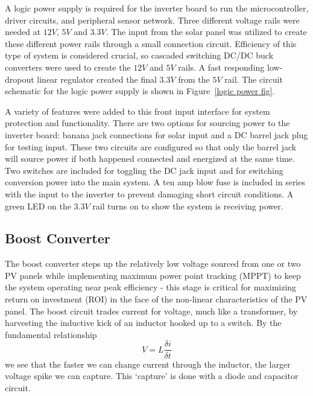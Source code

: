 A logic power supply is required for the inverter board to run the microcontroller, driver circuits, and peripheral sensor network. Three different voltage rails were needed at $12V$, $5V$ and $3.3V$. The input from the solar panel was utilized to create these different power rails through a small connection circuit. Efficiency of this type of system is considered crucial, so cascaded switching DC/DC buck converters were used to create the $12V$ and $5V$ rails. A fast responding low-dropout linear regulator created the final $3.3V$ from the $5V$ rail. The circuit schematic for the logic power supply is shown in Figure~\ref{logic power fig}.

A variety of features were added to this front input interface for system protection and functionality. There are two options for sourcing power to the inverter board: banana jack connections for solar input and a DC barrel jack plug for testing input. These two circuits are configured so that only the barrel jack will source power if both happened connected and energized at the same time. Two switches are included for toggling the DC jack input and for switching conversion power into the main system. A ten amp blow fuse is included in series with the input to the inverter to prevent damaging short circuit conditions. A green LED on the $3.3V$ rail turns on to show the system is receiving power.

\subsection{Boost Converter}
The boost converter steps up the relatively low voltage sourced from one or two PV panels while implementing maximum power point tracking (MPPT) to keep the system operating near peak efficiency - this stage is critical for maximizing return on investment (ROI) in the face of the non-linear characteristics of the PV panel. The boost circuit trades current for voltage, much like a transformer, by harvesting the inductive kick of an inductor hooked up to a switch. By the fundamental relationship
\begin{equation}
V=L\frac{\delta i}{\delta t}
\end{equation}
 we see that the faster we can change current through the inductor, the larger voltage spike we can capture. This `capture' is done with a diode and capacitor circuit.

